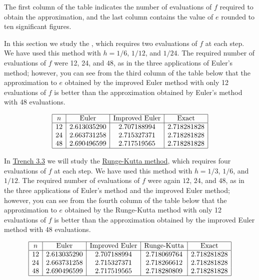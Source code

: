 \documentclass{ximera}
\begin{document}
The first column of the table
indicates
the number of evaluations of $f$ required to obtain the approximation, and
the last column contains the value of $e$ rounded to ten significant
figures.

In this section we study the
, which
requires two evaluations of $f$ at each step. We have used this method
with $h=1/6$, $1/12$, and $1/24$. The required number of evaluations
of $f$ were 12, 24, and $48$, as in the three applications of Euler's
method;     however, you can see from the third column of
the table below that the approximation to $e$ obtained by the
improved Euler method with only 12 evaluations of $f$ is better than
the approximation obtained by Euler's method with 48 evaluations.

\begin{center}
$$
\begin{array}{|c|c|c|c|}
\hline
n&
\text{Euler}&
\text{Improved Euler}&
\text{Exact}\\ \hline
12 & 2.613035290  &2.707188994  & 2.718281828 \\
24 & 2.663731258   &2.715327371   & 2.718281828 \\
48 & 2.690496599  &2.717519565  & 2.718281828
\\
\hline
\end{array}
$$
\end{center}

In \href{https://ximera.osu.edu/ode/main/rungeKutta/rungeKutta}{Trench 3.3} we will study the
\href{https://en.wikipedia.org/wiki/Runge%E2%80%93Kutta_methods}{Runge-Kutta method},
which requires four evaluations of $f$ at each step. We have used this
method with $h=1/3$, $1/6$, and $1/12$. The required number of
evaluations of $f$ were again $12$, $24$, and $48$, as in the three
applications of Euler's method and the improved Euler method;     however,
you can see from the fourth column of the table below that the
approximation to $e$ obtained by the Runge-Kutta method with only 12
evaluations of $f$ is better than the approximation obtained by the
improved Euler method with 48 evaluations.

\begin{center}
$$
\begin{array}{|c|c|c|c|c|}
\hline
n&
\text{Euler}&
\text{Improved Euler}&
\text{Runge-Kutta}&
\text{Exact}\\ \hline
12 & 2.613035290  &2.707188994  &2.718069764 & 2.718281828 \\
24 & 2.663731258   &2.715327371   &2.718266612 & 2.718281828 \\
48 & 2.690496599  &2.717519565  &2.718280809 & 2.718281828
\\
\hline
\end{array}
$$
\end{center}
\end{document}
